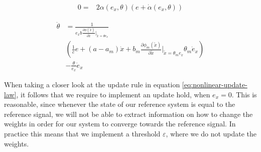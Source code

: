 
\begin{equation}
    \begin{aligned}
        0 = & 2\alpha(e_x, \theta)(e +  \dot \alpha(e_x, \theta))
    \end{aligned}
\end{equation}

\begin{equation}
    \begin{aligned}
     \dot \theta & = \frac{1}{e_x b \frac{\partial \phi(\tilde x)}{\partial \tilde x}\vert_{\tilde x=\theta e_x}}\\ 
     & (  \frac{1}{c} e + (a-a_m)\dot x + b_m\frac{\partial \phi_m(\tilde x)}{\partial \tilde x}\vert_{\tilde x=\theta_me_x}\theta_m \dot e_x) \\ 
    & - \frac{\theta}{e_x}\dot e_x
    \end{aligned}
    \label{eq:nonlinear-update-law}
\end{equation}

When taking a closer look at the update rule in equation \eqref{eq:nonlinear-update-law}, it follows that we require to implement an update hold, when $e_x=0$. This is reasonable, since whenever the state of our reference system is equal to the reference signal, we will not be able to extract information on how to change the weights in order for our system to converge towards the reference signal. In practice this means that we implement a threshold $\varepsilon$, where we do not update the weights.